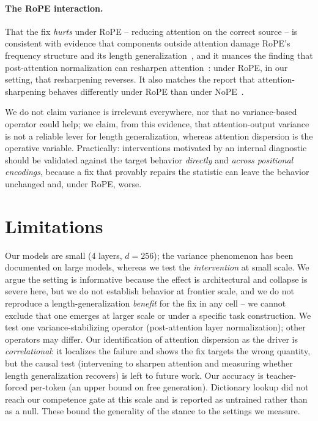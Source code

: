 \documentclass[11pt]{article}
\begin{document}
\paragraph{The RoPE interaction.} That the fix \emph{hurts} under RoPE -- reducing attention on the
correct source -- is consistent with evidence that components outside attention damage RoPE's frequency
structure and its length generalization~\cite{fope}, and it nuances the finding that post-attention
normalization can resharpen attention~\cite{postnorm}: under RoPE, in our setting, that resharpening
reverses. It also matches the report that attention-sharpening behaves differently under RoPE than under
NoPE~\cite{nopeentropy}.

We do not claim variance is irrelevant everywhere, nor that no variance-based operator could help; we
claim, from this evidence, that attention-output variance is not a reliable lever for length
generalization, whereas attention dispersion is the operative variable. Practically: interventions
motivated by an internal diagnostic should be validated against the target behavior \emph{directly} and
\emph{across positional encodings}, because a fix that provably repairs the statistic can leave the
behavior unchanged and, under RoPE, worse.

\section{Limitations}
Our models are small (4 layers, $d{=}256$); the variance phenomenon has been documented on large models,
whereas we test the \emph{intervention} at small scale. We argue the setting is informative because the
effect is architectural and collapse is severe here, but we do not establish behavior at frontier scale,
and we do not reproduce a length-generalization \emph{benefit} for the fix in any cell -- we cannot
exclude that one emerges at larger scale or under a specific task construction. We test one
variance-stabilizing operator (post-attention layer normalization); other operators may differ. Our
identification of attention dispersion as the driver is \emph{correlational}: it localizes the failure and
shows the fix targets the wrong quantity, but the causal test (intervening to sharpen attention and
measuring whether length generalization recovers) is left to future work. Our accuracy is teacher-forced
per-token (an upper bound on free generation). Dictionary lookup did not reach
our competence gate at this scale and is reported as untrained rather than as a null. These bound the
generality of the stance to the settings we measure.
\end{document}
